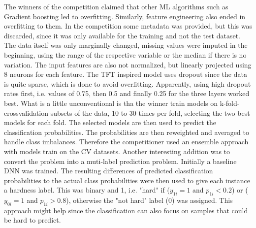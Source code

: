 The winners of the competition claimed that other ML algorithms such as Gradient boosting led to overfitting. Similarly,
feature engineering also ended in overfitting to them. In the competition some metadata was provided, but this was discarded,
since it was only available for the training and not the test dataset. The data itself was only marginally changed,
missing values were imputed in the beginning, using the range of the respective variable or the median if there is no variation.
The input features are also not normalized, but linearly projected using 8 neurons for each feature. The TFT inspired model
uses dropout since the data is quite sparse, which is done to avoid overfitting. Apparently, using high dropout rates first,
i.e. values of 0.75, then 0.5 and finally 0.25 for the three layers worked best. What is a little unconventional is tha the winner
train models on k-fold-crossvalidation subsets of the data, 10 to 30 times per fold, selecting the two best models for each fold.
The selected models are then used to predict the classification probabilities. The probabilities are then reweighted and averaged to handle
class imbalances. Therefore the competitioner used an ensemble approach with models train on the CV datasets. Another interesting addition was
to convert the problem into a muti-label prediction problem. Initially a baseline DNN was trained. The resulting differences of predicted
classification probabilities to the actual class probabilities were then used to give each instance a hardness label. This was binary
and 1, i.e. "hard" if ($y_{1i} = 1$ and $p_{1i} < 0.2$) or ($y_{0i} = 1$ and $p_{1i} > 0.8$), otherwise the "not hard" label (0) was assigned.
This approach might help since the classification can also focus on samples that could be hard to predict.
